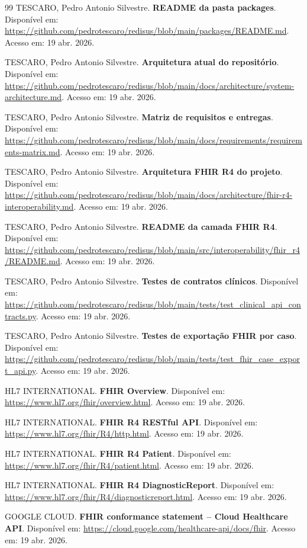 \documentclass[
    12pt,
    openright,
    oneside,
    a4paper,
    chapter=TITLE,
    section=TITLE,
    brazil,
    sumario=tradicional,
    hidelinks
]{abntex2}
\begin{document}
\begin{thebibliography}{99}
TESCARO, Pedro Antonio Silvestre. \textbf{README da pasta packages}. Dispon\'ivel em: \url{https://github.com/pedrotescaro/redisus/blob/main/packages/README.md}. Acesso em: 19 abr. 2026.

TESCARO, Pedro Antonio Silvestre. \textbf{Arquitetura atual do reposit\'orio}. Dispon\'ivel em: \url{https://github.com/pedrotescaro/redisus/blob/main/docs/architecture/system-architecture.md}. Acesso em: 19 abr. 2026.

TESCARO, Pedro Antonio Silvestre. \textbf{Matriz de requisitos e entregas}. Dispon\'ivel em: \url{https://github.com/pedrotescaro/redisus/blob/main/docs/requirements/requirements-matrix.md}. Acesso em: 19 abr. 2026.

TESCARO, Pedro Antonio Silvestre. \textbf{Arquitetura FHIR R4 do projeto}. Dispon\'ivel em: \url{https://github.com/pedrotescaro/redisus/blob/main/docs/architecture/fhir-r4-interoperability.md}. Acesso em: 19 abr. 2026.

TESCARO, Pedro Antonio Silvestre. \textbf{README da camada FHIR R4}. Dispon\'ivel em: \url{https://github.com/pedrotescaro/redisus/blob/main/src/interoperability/fhir_r4/README.md}. Acesso em: 19 abr. 2026.

TESCARO, Pedro Antonio Silvestre. \textbf{Testes de contratos cl\'inicos}. Dispon\'ivel em: \url{https://github.com/pedrotescaro/redisus/blob/main/tests/test_clinical_api_contracts.py}. Acesso em: 19 abr. 2026.

TESCARO, Pedro Antonio Silvestre. \textbf{Testes de exporta\c{c}\~ao FHIR por caso}. Dispon\'ivel em: \url{https://github.com/pedrotescaro/redisus/blob/main/tests/test_fhir_case_export_api.py}. Acesso em: 19 abr. 2026.

HL7 INTERNATIONAL. \textbf{FHIR Overview}. Dispon\'ivel em: \url{https://www.hl7.org/fhir/overview.html}. Acesso em: 19 abr. 2026.

HL7 INTERNATIONAL. \textbf{FHIR R4 RESTful API}. Dispon\'ivel em: \url{https://www.hl7.org/fhir/R4/http.html}. Acesso em: 19 abr. 2026.

HL7 INTERNATIONAL. \textbf{FHIR R4 Patient}. Dispon\'ivel em: \url{https://www.hl7.org/fhir/R4/patient.html}. Acesso em: 19 abr. 2026.

HL7 INTERNATIONAL. \textbf{FHIR R4 DiagnosticReport}. Dispon\'ivel em: \url{https://www.hl7.org/fhir/R4/diagnosticreport.html}. Acesso em: 19 abr. 2026.

GOOGLE CLOUD. \textbf{FHIR conformance statement -- Cloud Healthcare API}. Dispon\'ivel em: \url{https://cloud.google.com/healthcare-api/docs/fhir}. Acesso em: 19 abr. 2026.

\end{thebibliography}
\end{document}

